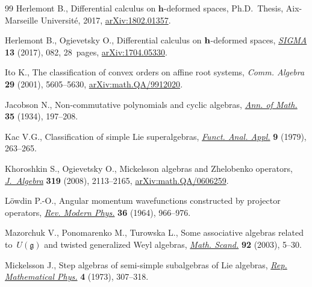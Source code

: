 \documentclass[pdftex]{sigma}
\numberwithin{equation}{section}
\begin{document}
\begin{thebibliography}{99}
Herlemont B., Differential calculus on $\mathbf{h}$-deformed spaces, Ph.D.~Thesis, {A}ix-Marseille {U}niversit\'e, 2017, \href{https://arxiv.org/abs/1802.01357}{arXiv:1802.01357}.

Herlemont B., Ogievetsky O., Differential calculus on {$\bf h$}-deformed
 spaces, \href{https://doi.org/10.3842/SIGMA.2017.082}{\textit{SIGMA}} \textbf{13} (2017), 082, 28~pages,
 \href{https://arxiv.org/abs/1704.05330}{arXiv:1704.05330}.

Ito K., The classification of convex orders on affine root systems,
\textit{Comm. Algebra} \textbf{29} (2001), 5605--5630,
 \href{https://arxiv.org/abs/math.QA/9912020}{arXiv:math.QA/9912020}.

Jacobson N., Non-commutative polynomials and cyclic algebras, \href{https://doi.org/10.2307/1968424}{\textit{Ann. of
 Math.}} \textbf{35} (1934), 197--208.

Kac V.G., Classification of simple {L}ie superalgebras, \href{https://doi.org/10.1007/BF01075610}{\textit{Funct. Anal.
 Appl.}} \textbf{9} (1979), 263--265.

Khoroshkin S., Ogievetsky O., Mickelsson algebras and {Z}helobenko operators,
 \href{https://doi.org/10.1016/j.jalgebra.2007.04.020}{\textit{J.~Algebra}} \textbf{319} (2008), 2113--2165,
 \href{https://arxiv.org/abs/math.QA/0606259}{arXiv:math.QA/0606259}.


L\"owdin P.-O., Angular momentum wavefunctions constructed by projector
 operators, \href{https://doi.org/10.1103/RevModPhys.36.966}{\textit{Rev. Modern Phys.}} \textbf{36} (1964), 966--976.

Mazorchuk V., Ponomarenko M., Turowska L., Some associative algebras related
 to~{$U(\mathfrak g)$} and twisted generalized {W}eyl algebras, \href{https://doi.org/10.7146/math.scand.a-14392}{\textit{Math.
 Scand.}} \textbf{92} (2003), 5--30.

Mickelsson J., Step algebras of semi-simple subalgebras of {L}ie algebras,
 \href{https://doi.org/10.1016/0034-4877(73)90006-2}{\textit{Rep. Mathematical Phys.}} \textbf{4} (1973), 307--318.


\end{thebibliography}
\end{document}
